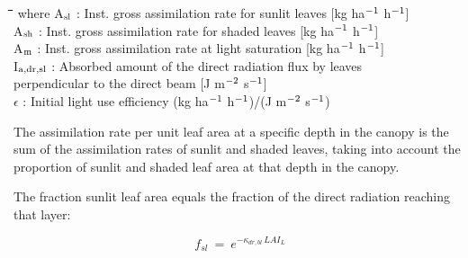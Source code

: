\nwln
\begin{tabbing}
\hspace{1.27cm}\=\hspace{1.27cm}\=\hspace{1.27cm}\=\hspace{1.27cm}\=%
\hspace{1.27cm}\=\hspace{1.27cm}\=\hspace{1.27cm}\=\hspace{1.27cm}\=%
\hspace{1.27cm}\=\hspace{1.27cm}\=\kill
where A$_{{\rm sl}}$ : Inst. gross assimilation rate for sunlit leaves        [kg ha$^{{\rm -1}}$ h$^{{\rm -1}}$]\\
A$_{{\rm sh}}$ : Inst. gross assimilation rate for shaded leaves        [kg ha$^{{\rm -1}}$ h$^{{\rm -1}}$]\\
A$_{{\rm m}}$ : Inst. gross assimilation rate at light saturation        [kg ha$^{{\rm -1}}$ h$^{{\rm -1}}$]\\
I$_{{\rm a,dr,sl}}$ : Absorbed amount of the direct radiation flux by leaves\\
   perpendicular to the direct beam        [J m$^{{\rm -2}}$ s$^{{\rm -1}}$]\\
$\epsilon$ : Initial light use efficiency           (kg ha$^{{\rm -1}}$ h$^{{\rm -1}}$)/(J m$^{{\rm -2}}$ s$^{{\rm -1}}$)
\end{tabbing}



The assimilation rate per unit leaf area at a specific depth in the canopy is the sum of the
assimilation rates of sunlit and shaded leaves, taking into account the proportion of sunlit
and shaded leaf area at that depth in the canopy. 




The fraction sunlit leaf area equals the fraction of the direct radiation reaching that layer:

\begin{displaymath}
f _{sl} ~=~  e ^{-\kappa _{dr,bl} \, LAI _{L} }
\end{displaymath}

